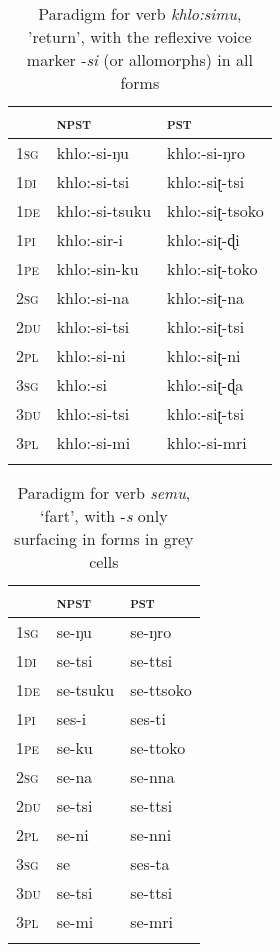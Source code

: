 \documentclass[output=paper]{langscibook}
\begin{document}
\begin{table}
\begin{tabularx}{0.5\textwidth}{lll}
\lsptoprule
& \textsc{npst} & \textsc{pst}\\
\midrule
\textsc{1sg} & khlo:-si-ŋu & khlo:-si-ŋro\\
\textsc{1di} & khlo:-si-tsi & khlo:-siʈ-tsi\\
\textsc{1de} & khlo:-si-tsuku & khlo:-siʈ-tsoko\\
\textsc{1pi} & khlo:-sir-i & khlo:-siʈ-ɖi\\
\textsc{1pe} & khlo:-sin-ku & khlo:-siʈ-toko\\
\textsc{2sg} & khlo:-si-na & khlo:-siʈ-na\\
\textsc{2du} & khlo:-si-tsi & khlo:-siʈ-tsi\\
\textsc{2pl} & khlo:-si-ni & khlo:-siʈ-ni\\
\textsc{3sg} & khlo:-si & khlo:-siʈ-ɖa\\
\textsc{3du} & khlo:-si-tsi & khlo:-siʈ-tsi\\
\textsc{3pl} & khlo:-si-mi & khlo:-si-mri\\
\lspbottomrule
\end{tabularx}
\caption{Paradigm for verb \textit{khlo:simu}, 'return', with the reflexive voice marker -\textit{si} (or allomorphs) in all forms}
\label{tab:Lahaussois:2}
\end{table}




\begin{table}
\begin{tabularx}{0.37\textwidth}{lll} 
\lsptoprule
& \textsc{npst} & \textsc{pst}\\
\midrule
\textsc{1sg} & se-ŋu & se-ŋro\\
\textsc{1di} & se-tsi & se-ttsi\\
\textsc{1de} & se-tsuku & se-ttsoko\\
\textsc{1pi} & ses-i & ses-ti\\
\textsc{1pe} & se-ku & se-ttoko\\
\textsc{2sg} & se-na & se-nna\\
\textsc{2du} & se-tsi & se-ttsi\\
\textsc{2pl} & se-ni & se-nni\\
\textsc{3sg} & se & ses-ta\\
\textsc{3du} & se-tsi & se-ttsi\\
\textsc{3pl} & se-mi & se-mri\\
\lspbottomrule
\end{tabularx}
\caption{Paradigm for verb \textit{semu}, ‘fart', with -\textit{s} only surfacing in forms in grey cells}
\label{tab:Lahaussois:3}
\end{table}
\end{document}
